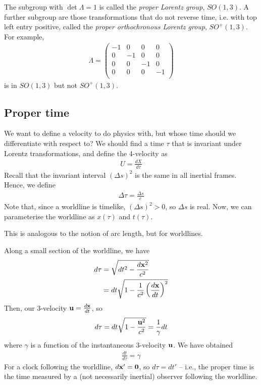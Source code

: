\documentclass{../template/note}
\begin{document}
    The subgroup with \(\det \Lambda = 1\) is called the \emph{proper Lorentz group}, \(SO(1, 3)\). A further subgroup are those transformations that do not reverse time, i.e. with top left entry positive, called the \emph{proper orthochronous Lorentz group}, \(SO^+(1, 3)\). For example,
    \begin{align*}
        \Lambda = \begin{pmatrix}
         -1 & 0 & 0 & 0 \\
         0 & -1 & 0 & 0 \\
         0 & 0 & -1 & 0 \\
         0 & 0 & 0 & -1 \\
        \end{pmatrix}
    \end{align*}
    is in \(SO(1, 3)\) but not \(SO^+(1, 3)\).
    
    \subsection{Proper time}

    We want to define a velocity to do physics with, but whose time should we differentiate with respect to? We should find a time \(\tau\) that is invariant under Lorentz transformations, and define the 4-velocity as
    \begin{align*}
        U = \frac{dX}{d\tau}
    \end{align*}
    Recall that the invariant interval \((\Delta s)^2\) is the same in all inertial frames. Hence, we define
    \begin{align*}
        \Delta \tau = \frac{\Delta s}{c}
    \end{align*}
    Note that, since a worldline is timelike, \((\Delta s)^2 > 0\), so \(\Delta s\) is real. Now, we can parameterise the worldline as \(x(\tau)\) and \(t(\tau)\).

    \begin{remark*}
        This is analogous to the notion of arc length, but for worldlines.
    \end{remark*}
    Along a small section of the worldline, we have
    \begin{align*}
        d\tau &= \sqrt{dt^2 - \frac{d\V x^2}{c^2}} \\
        &= dt \sqrt{1-\frac{1}{c^2} \left(\frac{d\V x}{dt}\right)^2}
    \end{align*}
    Then, our 3-velocity \(\V u = \frac{d\V x}{dt}\), so
    \begin{align*}
        d\tau = dt\sqrt{1-\frac{\V u^2}{c^2}} = \frac 1 \gamma dt
    \end{align*}
    where \(\gamma\) is a function of the instantaneous 3-velocity \(\V u\). We have obtained
    \begin{align*}
        \frac{dt}{d\tau} = \gamma
    \end{align*}
    For a clock following the worldline, \(d \V x' = \V 0\), so \(d\tau = dt'\) -- i.e., the proper time is the time measured by a (not necessarily inertial) observer following the worldline.
    
\end{document}
